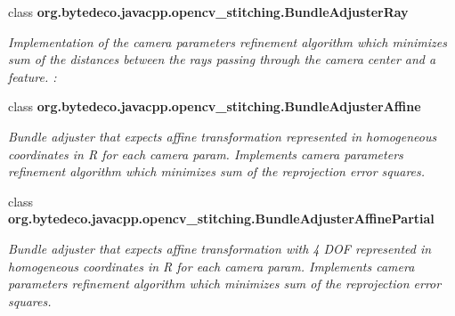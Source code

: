 \begin{DoxyCompactItemize}
class {\bfseries org.\+bytedeco.\+javacpp.\+opencv\+\_\+stitching.\+Bundle\+Adjuster\+Ray}
\begin{DoxyCompactList}\small\item\em Implementation of the camera parameters refinement algorithm which minimizes sum of the distances between the rays passing through the camera center and a feature. \+: \end{DoxyCompactList}\item 
class {\bfseries org.\+bytedeco.\+javacpp.\+opencv\+\_\+stitching.\+Bundle\+Adjuster\+Affine}
\begin{DoxyCompactList}\small\item\em Bundle adjuster that expects affine transformation represented in homogeneous coordinates in R for each camera param. Implements camera parameters refinement algorithm which minimizes sum of the reprojection error squares. \end{DoxyCompactList}\item 
class {\bfseries org.\+bytedeco.\+javacpp.\+opencv\+\_\+stitching.\+Bundle\+Adjuster\+Affine\+Partial}
\begin{DoxyCompactList}\small\item\em Bundle adjuster that expects affine transformation with 4 D\+OF represented in homogeneous coordinates in R for each camera param. Implements camera parameters refinement algorithm which minimizes sum of the reprojection error squares. \end{DoxyCompactList}\end{DoxyCompactItemize}
